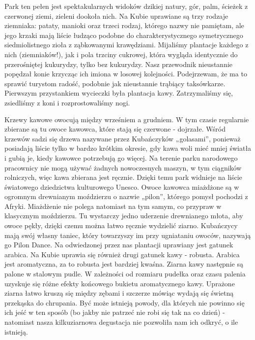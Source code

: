 \noindent Park ten pełen jest spektakularnych widoków dzikiej natury, gór, palm, ścieżek z czerwonej ziemi, zieleni dookoła nich.
Na Kubie uprawiane są trzy rodzaje ziemniaka: pataty, manioki oraz trzeci rodzaj, którego nazwy nie pamiętam, ale jego krzaki mają liście łudząco podobne do charakterystycznego symetrycznego siedmiolistnego zioła z ząbkowanymi krawędziami.
Mijaliśmy plantacje każdego z nich (ziemniaków!), jak i pola trzciny cukrowej, która wygląda identycznie do przerośniętej kukurydzy, tylko bez kukurydzy.
Nasz przewodnik nieustannie popędzał konie krzycząc ich imiona w losowej kolejności.
Podejrzewam, że ma to sprawić turystom radość, podobnie jak nieustannie trąbiący taksówkarze.
Pierwszym przystankiem wycieczki była plantacja kawy.
Zatrzymaliśmy się, zsiedliśmy z koni i rozprostowaliśmy nogi.
\par Krzewy kawowe owocują między wrześniem a grudniem.
W tym czasie regularnie zbierane są tu owoce kawowca, które stają się czerwone - dojrzałe.
Wśród krzewów sadzi się drzewa nazywane przez Kubańczyków „golasami”, ponieważ posiadają liście tylko w bardzo krótkim okresie, gdy kawa woli mieć mniej światła i gubią je, kiedy kawowce potrzebują go więcej.
Na terenie parku narodowego pracownicy nie mogą używać żadnych nowoczesnych maszyn, w tym ciągników rolniczych, więc kawa zbierana jest ręcznie.
Dzięki temu park widnieje na liście światowego dziedzictwa kulturowego Unesco.
Owoce kawowca miażdżone są w ogromnym drewnianym moździerzu o nazwie „pilon”, którego pomysł pochodzi z Afryki.
Miażdżenie nie polega natomiast na tym samym, co przypraw w klasycznym moździerzu.
Tu wystarczy jedno uderzenie drewnianego młota, aby owoce pękły, dzięki czemu można łatwo ręcznie wydzielić ziarno.
Kubańczycy mają swój własny taniec, który towarzyszy im przy ugniataniu owoców, nazywają go Pilon Dance.
Na odwiedzonej przez nas plantacji uprawiany jest gatunek arabica.
Na Kubie uprawia się również drugi gatunek kawy - robusta.
Arabica jest aromatyczna, za to robusta jest bardziej kwaśna.
Ziarna kawy następnie są palone w stalowym pudle.
W zależności od rozmiaru pudełka oraz czasu palenia uzyskuje się różne efekty końcowego bukietu aromatycznego kawy.
Uprażone ziarna łatwo kruszą się między zębami i szczerze mówiąc wydają się świetną przekąska do chrupania.
Być może istnieją powody, dla których nie powinno się ich jeść w ten sposób (bo jakby nie patrzeć nie robi się tak na co dzień) - natomiast nasza kilkuziarnowa degustacja nie pozwoliła nam ich odkryć, o ile istnieją.
